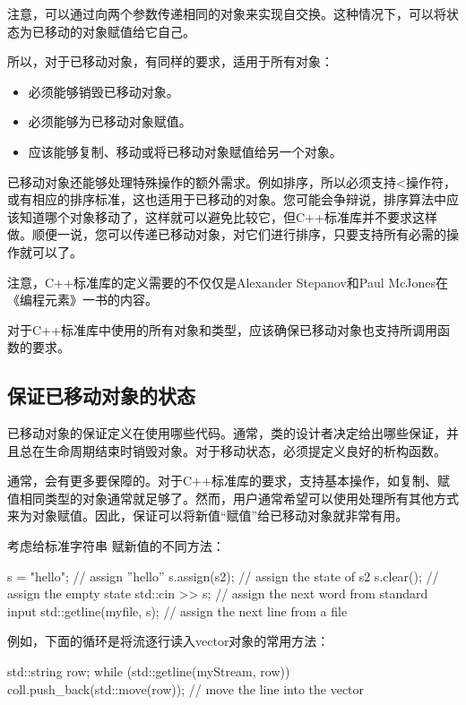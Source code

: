 注意，可以通过向两个参数传递相同的对象来实现自交换。这种情况下，可以将状态为已移动的对象赋值给它自己。

所以，对于已移动对象，有同样的要求，适用于所有对象：

\begin{itemize}
	\item 必须能够销毁已移动对象。
	\item 必须能够为已移动对象赋值。
	\item 应该能够复制、移动或将已移动对象赋值给另一个对象。
\end{itemize}

已移动对象还能够处理特殊操作的额外需求。例如排序，所以必须支持<操作符，或有相应的排序标准，这也适用于已移动的对象。您可能会争辩说，排序算法中应该知道哪个对象移动了，这样就可以避免比较它，但C++标准库并不要求这样做。顺便一说，您可以传递已移动对象，对它们进行排序，只要支持所有必需的操作就可以了。

注意，C++标准库的定义需要的不仅仅是Alexander Stepanov和Paul McJones在《编程元素》一书的内容。

对于C++标准库中使用的所有对象和类型，应该确保已移动对象也支持所调用函数的要求。

\subsection{保证已移动对象的状态}

已移动对象的保证定义在使用哪些代码。通常，类的设计者决定给出哪些保证，并且总在生命周期结束时销毁对象。对于移动状态，必须提定义良好的析构函数。

通常，会有更多要保障的。对于C++标准库的要求，支持基本操作，如复制、赋值相同类型的对象通常就足够了。然而，用户通常希望可以使用处理所有其他方式来为对象赋值。因此，保证可以将新值“赋值”给已移动对象就非常有用。

考虑给标准字符串  赋新值的不同方法：

\begin{cppcode}
s = "hello"; // assign ”hello”
s.assign(s2); // assign the state of s2
s.clear(); // assign the empty state
std::cin >> s; // assign the next word from standard input
std::getline(myfile, s); // assign the next line from a file
\end{cppcode}

例如，下面的循环是将流逐行读入vector对象的常用方法：

\begin{cppcode}
std::string row;
while (std::getline(myStream, row)) {
	coll.push_back(std::move(row)); // move the line into the vector
}
\end{cppcode}


